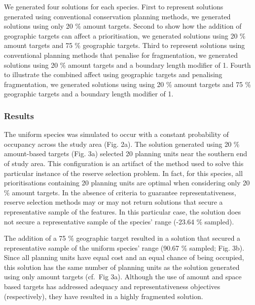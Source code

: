 \documentclass[11pt,]{article}
\begin{document}
We generated four solutions for each species. First to represent
solutions generated using conventional conservation planning methods, we
generated solutions using only 20 \% amount targets. Second to show how
the addition of geographic targets can affect a prioritisation, we
generated solutions using 20 \% amount targets and 75 \% geographic
targets. Third to represent solutions using conventional planning
methods that penalise for fragmentation, we generated solutions using 20
\% amount targets and a boundary length modifier of 1. Fourth to
illustrate the combined affect using geographic targets and penalising
fragmentation, we generated solutions using using 20 \% amount targets
and 75 \% geographic targets and a boundary length modifier of 1.

\subsubsection{Results}\label{results}

The uniform species was simulated to occur with a constant probability
of occupancy across the study area (Fig. 2a). The solution generated
using 20 \% amount-based targets (Fig. 3a) selected 20 planning units
near the southern end of study area. This configuration is an artifact
of the method used to solve this particular instance of the reserve
selection problem. In fact, for this species, all prioritisations
containing 20 planning units are optimal when considering only 20 \%
amount targets. In the absence of criteria to guarantee
representativeness, reserve selection methods may or may not return
solutions that secure a representative sample of the features. In this
particular case, the solution does not secure a representative sample of
the species' range (-23.64 \% sampled).

The addition of a 75 \% geographic target resulted in a solution that
secured a representative sample of the uniform species' range (90.67 \%
sampled; Fig. 3b). Since all planning units have equal cost and an equal
chance of being occupied, this solution has the same number of planning
units as the solution generated using only amount targets (cf.~Fig 3a).
Although the use of amount and space based targets has addressed
adequacy and representativeness objectives (respectively), they have
resulted in a highly fragmented solution.
\end{document}
